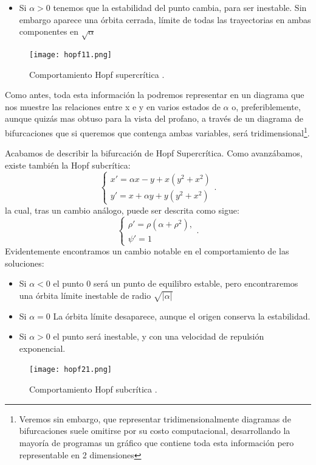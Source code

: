 \begin{enumerate}
\begin{itemize}
		\item Si $\alpha>0$ tenemos que la estabilidad del punto cambia, para ser inestable. Sin embargo aparece una órbita cerrada, límite de todas las trayectorias en ambas componentes en $\sqrt{\alpha}$ 
	\end{itemize}
	\begin{figure}[H]
		\centering
		\texttt{[image: hopf11.png]}
		\caption{Comportamiento Hopf supercrítica \cite{Kuznet}.}
		\label{hopf1}
	\end{figure}
	Como antes, toda esta información la podremos representar en un diagrama que nos muestre las relaciones entre x e y en varios estados de $\alpha$ o, preferiblemente, aunque quizás mas obtuso para la vista del profano, a través de un diagrama de bifurcaciones que si queremos que contenga ambas variables, será tridimensional\footnote{Veremos sin embargo, que representar tridimensionalmente diagramas de bifurcaciones suele omitirse por su costo computacional, desarrollando la mayoría de programas un gráfico que contiene toda esta información pero representable en 2 dimensiones}.
	
	Acabamos de describir la bifurcación de Hopf Supercrítica. Como avanzábamos, existe también la Hopf subcrítica:\[ \left \{ \begin{matrix} x'=\alpha x-y+x(y^2+x^2)\\ y'=x+\alpha y+y(y^2+x^2)\end{matrix}\right . .\]
	la cual, tras un cambio análogo, puede ser descrita como sigue:\[ \left \{\begin{matrix} \rho' = \rho(\alpha + \rho ^2 ),\\ \psi' =1 \end{matrix}\right .. \]
	Evidentemente encontramos un cambio notable en el comportamiento de las soluciones:
	\begin{itemize}
		\item Si $\alpha<0$ el punto 0 será un punto de equilibro estable, pero encontraremos una órbita límite inestable de radio $\sqrt{|\alpha|}$
		\item Si $\alpha=0$ La órbita límite desaparece, aunque el origen conserva la estabilidad.  
		\item Si $\alpha>0$ el punto será inestable, y con una velocidad de repulsión exponencial.
	\end{itemize}
		\begin{figure}[H]
			\centering
			\texttt{[image: hopf21.png]}
			\caption{Comportamiento Hopf subcrítica \cite{Kuznet}. }
		\label{hopf2}
	\end{figure}
	

\end{enumerate}
